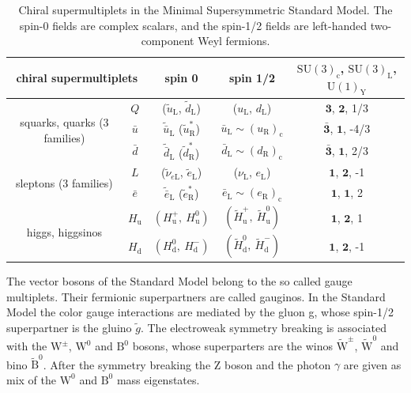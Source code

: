 \begin{table}[tbh!]
	\centering
	\begin{tabular}{|c || c | c | c | c |}
		\hline
		\multicolumn{2}{|c|}{chiral supermultiplets} & spin 0 & spin 1/2 & $\mathrm{SU}(3)_{\mathrm{c}}$, $\mathrm{SU}(3)_{\mathrm{L}}$, $\mathrm{U}(1)_{\mathrm{Y}}$\\\hline\hline
		\multirow{3}{*}{squarks, quarks (3 families)} &  $Q$  & ($\widetilde{u}_{\mathrm{L}}$, $\widetilde{d}_{\mathrm{L}}$) & ($u_{\mathrm{L}}$, $d_{\mathrm{L}}$) & $\mathbf{3}$, $\mathbf{2}$, 1/3 \\
		& $\bar{u}$ & $\widetilde{\bar{u}}_{\mathrm{L}}$ ($\widetilde{u}_{\mathrm{R}}^*$) & $\bar{u}_{\mathrm{L}} \sim (u_{\mathrm{R}})_{\mathrm{c}}$ & $\bar{\mathbf{{3}}}$, $\mathbf{1}$, -4/3 \\
		& $\bar{d}$ & $\widetilde{\bar{d}}_{\mathrm{L}}$ ($\widetilde{d}_{\mathrm{R}}^*$) & $\bar{d}_{\mathrm{L}} \sim (d_{\mathrm{R}})_{\mathrm{c}}$ & $\bar{\mathbf{3}}$, $\mathbf{1}$, 2/3 \\\hline
		\multirow{2}{*}{sleptons (3 families)} & $L$ & ($\widetilde{\nu}_{e\mathrm{L}}$, $\widetilde{e}_{\mathrm{L}}$) & ($\nu_{\mathrm{L}}$, $e_{\mathrm{L}}$) & $\mathbf{1}$, $\mathbf{2}$, -1 \\
		& $\bar{e}$ & $\widetilde{\bar{e}}_{\mathrm{L}}$ ($\widetilde{e}_{\mathrm{R}}^*$) & $\bar{e}_{\mathrm{L}} \sim (e_{\mathrm{R}})_{\mathrm{c}}$& $\mathbf{1}$, $\mathbf{1}$, 2 \\\hline
		\multirow{2}{*}{higgs, higgsinos} & $H_{\text{u}}$ & $\left(H_{\text{u}}^+,~H_{\text{u}}^0\right)$ & $\left(\widetilde{H}_{\text{u}}^+,~ \widetilde{H}_{\text{u}}^0\right)$ & $\mathbf{1}$, $\mathbf{2}$, 1 \\
		& $H_{\text{d}}$ & $\left(H_{\text{d}}^0,~H_{\text{d}}^-\right)$ & $\left(\widetilde{H}_{\text{d}}^0,~ \widetilde{H}_{\text{d}}^-\right)$ & $\mathbf{1}$, $\mathbf{2}$, -1 \\\hline
	\end{tabular}
	\caption{Chiral supermultiplets in the Minimal Supersymmetric Standard Model. The spin-0
		fields are complex scalars, and the spin-1/2 fields are left-handed two-component Weyl fermions.}
	\label{fig:chiral_supermultiplet}
\end{table}

The vector bosons of the Standard Model belong to the so called gauge multiplets. Their fermionic superpartners are called gauginos. In the Standard Model the color gauge interactions are mediated by the gluon g, whose spin-1/2 superpartner is the gluino $\widetilde{g}$. The electroweak symmetry breaking is associated with the $\text{W}^{\pm}$, $\text{W}^{0}$ and $\text{B}^{0}$ bosons, whose superparters are the winos $\widetilde{\text{W}}^{\pm}$, $\widetilde{\text{W}}^{0}$ and bino $\widetilde{\text{B}}^{0}$. After the symmetry breaking the Z boson and the photon $\gamma$ are given as mix of the $\text{W}^{0}$ and $\text{B}^{0}$ mass eigenstates. 

